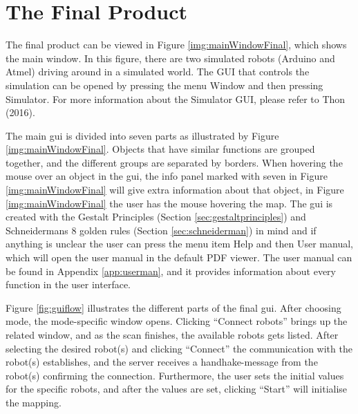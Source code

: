 \section{The Final Product}
The final product can be viewed in Figure \ref{img:mainWindowFinal}, which shows the main window. In this figure, there are two simulated robots (Arduino and Atmel) driving around in a simulated world. The GUI that controls the simulation can be opened by pressing the menu Window and then pressing Simulator. For more information about the Simulator GUI, please refer to Thon (2016).


The main \acrshort{gui} is divided into seven parts as illustrated by Figure \ref{img:mainWindowFinal}. Objects that have similar functions are grouped together, and the different groups are separated by borders. When hovering the mouse over an object in the \acrshort{gui}, the info panel marked with seven in Figure \ref{img:mainWindowFinal} will give extra information about that object, in Figure \ref{img:mainWindowFinal} the user has the mouse hovering the map. The \acrshort{gui} is created with the Gestalt Principles (Section \ref{sec:gestaltprinciples}) and Schneidermans 8 golden rules (Section \ref{sec:schneiderman}) in mind and if anything is unclear the user can press the menu item Help and then User manual, which will open the user manual in the default PDF viewer. The user manual can be found in Appendix \ref{app:userman}, and it provides information about every function in the user interface.

Figure \ref{fig:guiflow} illustrates the different parts of the final \acrshort{gui}. After choosing mode, the mode-specific window opens. Clicking ``Connect robots'' brings up the related window, and as the scan finishes, the available robots gets listed. After selecting the desired robot(s) and clicking ``Connect'' the communication with the robot(s) establishes, and the server receives a handhake-message from the robot(s) confirming the connection. Furthermore, the user sets the initial values for the specific robots, and after the values are set, clicking ``Start'' will initialise the mapping.

